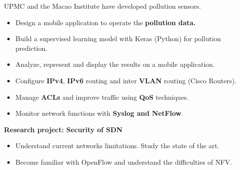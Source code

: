 \divider

UPMC and the Macao Institute have developed pollution sensors.
\begin{itemize}
	\item Design a mobile application to operate the \textbf {pollution data.}
	\item Build a supervised learning model with Keras (Python) for pollution prediction.
	\item Analyze, represent and display the results on a mobile application.
\end{itemize}

\divider

	

\begin{itemize}
	\item Configure \textbf {IPv4}, \textbf {IPv6} routing and inter \textbf {VLAN} routing (Cisco Routers).
	\item Manage \textbf {ACLs} and improve traffic using \textbf {QoS} techniques.
	\item Monitor network functions with \textbf {Syslog and NetFlow}.
\end{itemize}


\textbf{\large Research project: Security of SDN}
\medskip
\begin{itemize}
	\item Understand current networks limitations. Study the state of the art.
	\item Become familiar with OpenFlow and understand the difficulties of NFV.
\end{itemize}

